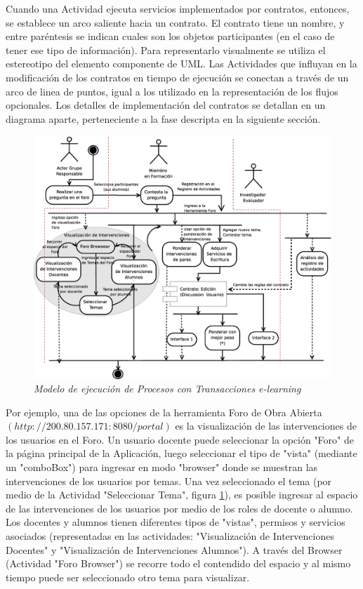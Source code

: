 Cuando una Actividad ejecuta servicios implementados por contratos, entonces, se
establece un arco saliente hacia un contrato. El contrato tiene un nombre, y
entre paréntesis se indican cuales son los objetos participantes (en el caso de
tener ese tipo de información). Para representarlo visualmente se utiliza el
estereotipo del elemento componente de UML. Las Actividades que influyan en la
modificación de los contratos en tiempo de ejecución se conectan a través de un
arco de linea de puntos, igual a los utilizado en la representación de los
flujos opcionales. Los detalles de implementación del contratos se detallan en
un diagrama aparte, perteneciente a la fase descripta en la siguiente sección.

	\begin{figure}[!h]
        \begin{center}

	\includegraphics[width=5 in,totalheight=4 in]{proceso.eps}
                                    \caption{\small \sl Modelo de ejecución de
Procesos con Transacciones e-learning} \label{modelodeejecucion}
         \end{center}
         \end{figure}


Por ejemplo, una de las opciones de la herramienta Foro de Obra Abierta
$(http://200.80.157.171:8080/portal)$ es la visualización de las intervenciones
de los usuarios en el Foro. Un usuario docente puede seleccionar la opción
"Foro" de la página principal de la Aplicación, luego seleccionar el tipo de
"vista" (mediante un "comboBox") para ingresar en modo "browser" donde se
muestran las intervenciones de los usuarios por temas. Una vez seleccionado el
tema (por medio de la Actividad "Seleccionar Tema", figura
\ref{modelodeejecucion}), es posible ingresar al espacio de las intervenciones
de los usuarios por medio de los roles de docente o alumno. Los docentes y
alumnos tienen diferentes tipos de "vistas", permisos y servicios asociados
(representadas en las actividades: "Visualización de Intervenciones Docentes" y
"Visualización de Intervenciones Alumnos"). A  través del Browser (Actividad
"Foro Browser") se recorre todo el contendido del espacio y al mismo tiempo
puede ser seleccionado otro tema para visualizar.

